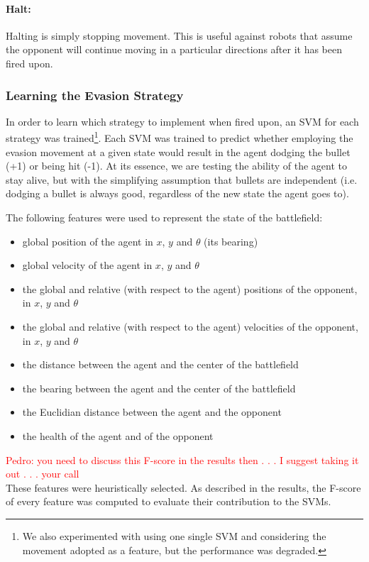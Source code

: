 \documentclass{article}
\newcommand{\xxx}[1]{\textcolor{red}{#1}}
\theoremstyle{plain}
\theoremstyle{definition}
\theoremstyle{remark}
\begin{document}
\paragraph{Halt:}
Halting is simply stopping movement. This is useful against robots that assume the opponent will continue moving in a particular directions after it has been fired upon.

\subsubsection*{Learning the Evasion Strategy}
In order to learn which strategy to implement when fired upon, an SVM for each strategy was trained\footnote{We also experimented with using one single SVM and considering the movement adopted as a feature, but the performance was degraded.}. Each SVM was trained to predict whether employing the evasion movement at a given state would result in the agent dodging the bullet (+1) or being hit (-1). At its essence, we are testing the ability of the agent to stay alive, but with the simplifying assumption that bullets are independent (i.e. dodging a bullet is always good, regardless of the new state the agent goes to).
 
The following features were used to represent the state of the battlefield:

\begin{itemize}
	\item global position of the agent in $x$, $y$ and $\theta$ (its bearing)
	\item global velocity of the agent in $x$, $y$ and $\theta$
	\item the global and relative (with respect to the agent) positions of the opponent, in $x$, $y$ and $\theta$
	\item the global and relative (with respect to the agent) velocities of the opponent, in $x$, $y$ and $\theta$
	\item the distance between the agent and the center of the battlefield
	\item the bearing between the agent and the center of the battlefield
	\item the Euclidian distance between the agent and the opponent
	\item the health of the agent and of the opponent
\end{itemize}

\xxx{Pedro: you need to discuss this F-score in the results then . . . I suggest taking it out . . . your call}\\
These features were heuristically selected. As described in the results, the F-score of every feature was computed to evaluate their contribution to the SVMs.
\end{document}

